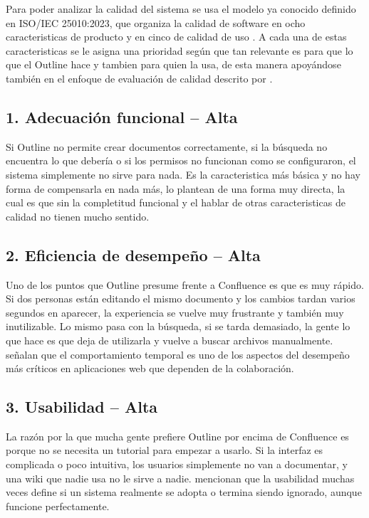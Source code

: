 \documentclass{report}
\begin{document}
Para poder analizar la calidad del sistema se usa el modelo ya conocido definido en ISO/IEC 25010:2023, que organiza la calidad de software en ocho caracteristicas de producto y en cinco de calidad de uso \cite{iso25010_2023}. A cada una de estas caracteristicas se le asigna una prioridad según que tan relevante es para que lo que el Outline hace y tambien para quien la usa, de esta manera apoyándose también en el enfoque de evaluación de calidad descrito por \cite{pressman2020}. 


\subsection*{1. Adecuación funcional -- Alta}

Si Outline no permite crear documentos correctamente, si la búsqueda no encuentra lo que debería o si los permisos no funcionan como se configuraron, el sistema simplemente no sirve para nada. Es la caracteristica más básica y no hay forma de compensarla en nada más, \cite{pressman2020} lo plantean de una forma muy directa, la cual es que sin la completitud funcional y el hablar de otras caracteristicas de calidad no tienen mucho sentido.
 
\subsection*{2. Eficiencia de desempeño -- Alta}

Uno de los puntos que Outline presume frente a Confluence es que es muy rápido. Si dos personas están editando el mismo documento y los cambios tardan varios segundos en aparecer, la experiencia se vuelve muy frustrante y también muy inutilizable. Lo mismo pasa con la búsqueda, si se tarda demasiado, la gente lo que hace es que deja de utilizarla y vuelve a buscar archivos manualmente. \cite{pressman2020} señalan que el comportamiento temporal es uno de los aspectos del desempeño más críticos en aplicaciones web que dependen de la colaboración.

\subsection*{3. Usabilidad -- Alta}

La razón por la que mucha gente prefiere Outline por encima de Confluence es porque no se necesita un tutorial para empezar a usarlo. Si la interfaz es complicada o poco intuitiva, los usuarios simplemente no van a documentar, y una wiki que nadie usa no le sirve a nadie. \cite{pressman2020} mencionan que la usabilidad muchas veces define si un sistema realmente se adopta o termina siendo ignorado, aunque funcione perfectamente.
\end{document}
